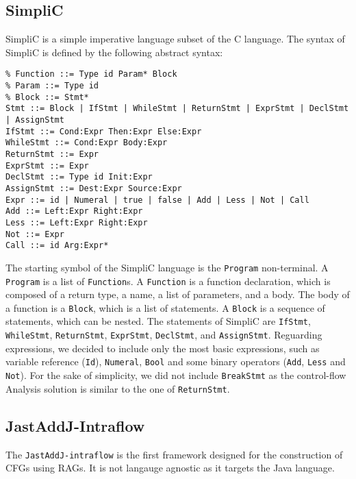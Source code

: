 \subsection{SimpliC}
SimpliC is a simple imperative language subset of the C language.
The syntax of SimpliC is defined by the following abstract syntax:
\begin{lstlisting}[caption={Syntax of the SimpliC language}]
% Program ::= Function*
% Function ::= Type id Param* Block
% Param ::= Type id
% Block ::= Stmt*
Stmt ::= Block | IfStmt | WhileStmt | ReturnStmt | ExprStmt | DeclStmt | AssignStmt
IfStmt ::= Cond:Expr Then:Expr Else:Expr
WhileStmt ::= Cond:Expr Body:Expr
ReturnStmt ::= Expr
ExprStmt ::= Expr
DeclStmt ::= Type id Init:Expr
AssignStmt ::= Dest:Expr Source:Expr
Expr ::= id | Numeral | true | false | Add | Less | Not | Call
Add ::= Left:Expr Right:Expr
Less ::= Left:Expr Right:Expr
Not ::= Expr
Call ::= id Arg:Expr*
\end{lstlisting}
The starting symbol of the SimpliC language is the \texttt{Program} non-terminal.
A \texttt{Program} is a list of \texttt{Function}s. A \texttt{Function} is a function
declaration, which is composed of a return type, a name, a list of parameters, and a body.
The body of a function is a \texttt{Block}, which is a list of statements. A \texttt{Block}
is a sequence of statements, which can be nested. The statements of SimpliC are
\texttt{IfStmt}, \texttt{WhileStmt}, \texttt{ReturnStmt}, \texttt{ExprStmt}, \texttt{DeclStmt},
and \texttt{AssignStmt}. Reguarding expressions, we decided to include only the most basic
expressions, such as variable reference (\texttt{Id}),  \texttt{Numeral}, \texttt{Bool}
and some binary operators (\texttt{Add}, \texttt{Less} and \texttt{Not}).
For the sake of simplicity, we did not include \texttt{BreakStmt} as the control-flow Analysis
solution is similar to the one of \texttt{ReturnStmt}. 

\subsection{JastAddJ-Intraflow}
\label{sec:jastaddj-intraflow}
The \texttt{JastAddJ-intraflow} is the first framework designed for the construction of CFGs
using RAGs. It is not langauge agnostic as it targets the Java language. 



